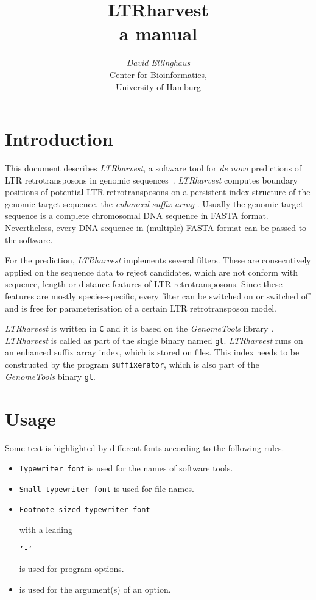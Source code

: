 \documentclass[12pt,titlepage]{article}
\title{LTRharvest\\
a manual}
\author{\begin{tabular}{c}
         \emph{David Ellinghaus}\\
         Center for Bioinformatics,\\
         University of Hamburg
        \end{tabular}}
\newcommand{\LTRharvest}{\textit{LTRharvest}\xspace}
\newcommand{\GenomeTools}{\textit{GenomeTools}\xspace}
\newcommand{\Gt}{\texttt{gt}\xspace}
\begin{document}
\maketitle

\section{Introduction} \label{Introduction}

This document describes \LTRharvest, a software tool
for \textit{de novo} predictions of LTR 
retrotransposons in genomic sequences~\cite{EKW07}.
\LTRharvest computes boundary positions of potential
LTR retrotransposons
on a persistent index structure of the genomic target sequence, 
the \textit{enhanced suffix array} \cite{AKO04}. Usually
the genomic target sequence is a complete chromosomal DNA sequence
in FASTA format. Nevertheless, every DNA sequence in (multiple) 
FASTA format can be passed to the software. 

For the prediction, \LTRharvest implements several filters.
These are consecutively applied on the sequence
data to reject candidates, which are not conform with sequence,
length or distance features of LTR retrotransposons. 
Since these features are mostly species-specific,
every filter can be switched on or switched off and is free for 
parameterisation of a certain LTR retrotransposon model.

\LTRharvest is written in \texttt{C} and it is based 
on the \GenomeTools library \cite{genometools}. \LTRharvest is called
as part of the single binary named \Gt.
\LTRharvest runs on an enhanced suffix array index, which is stored on files.
This index needs to be constructed by the program \texttt{suffixerator}, which
is also part of the \GenomeTools binary \Gt.

\section{Usage} \label{Usage}

Some text is highlighted by different fonts according to the following rules.

\begin{itemize}
\item \texttt{Typewriter font} is used for the names of software tools.
\item \texttt{\small{Small typewriter font}} is used for file names.
\item \begin{footnotesize}\texttt{Footnote sized typewriter font}
      \end{footnotesize} with a leading 
      \begin{footnotesize}\texttt{'-'}\end{footnotesize} 
      is used for program options.
\item {} is used for the argument(s) of an
      option.
\end{itemize}
\end{document}
